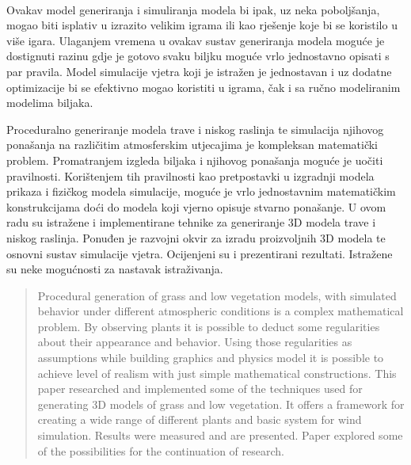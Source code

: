 \documentclass[times, utf8, diplomski]{fer}
\begin{document}
\paragraph{}
Ovakav model generiranja i simuliranja modela bi ipak, uz neka poboljšanja, mogao biti 
isplativ u izrazito velikim igrama ili kao rješenje koje bi se koristilo u više igara. 
Ulaganjem vremena u ovakav sustav generiranja modela moguće je dostignuti razinu gdje je 
gotovo svaku biljku moguće vrlo jednostavno opisati s par pravila. Model simulacije vjetra 
koji je istražen je jednostavan i uz dodatne optimizacije bi se efektivno mogao koristiti u 
igrama, čak i sa ručno modeliranim modelima biljaka.


\listoffigures

\lstlistoflistings
{}




\begin{sazetak}
Proceduralno generiranje modela trave i niskog raslinja te simulacija njihovog ponašanja na 
različitim atmosferskim utjecajima je kompleksan matematički problem. Promatranjem izgleda 
biljaka i njihovog ponašanja moguće je uočiti pravilnosti. Korištenjem tih pravilnosti kao 
pretpostavki u izgradnji modela prikaza i fizičkog modela simulacije, moguće je vrlo 
jednostavnim matematičkim konstrukcijama doći do modela koji vjerno opisuje stvarno 
ponašanje. U ovom radu su istražene i implementirane tehnike za generiranje 3D modela trave 
i niskog raslinja. Ponuđen je razvojni okvir za izradu proizvoljnih 3D modela te osnovni 
sustav simulacije vjetra. Ocijenjeni su i prezentirani rezultati. Istražene su neke 
mogućnosti za nastavak istraživanja.

\end{sazetak}

\begin{abstract}
Procedural generation of grass and low vegetation models, with simulated behavior under 
different atmospheric conditions is a complex mathematical problem. By observing plants it 
is possible to deduct some regularities about their appearance and behavior. Using those 
regularities as assumptions while building graphics and physics model it is possible to 
achieve level of realism with just simple mathematical constructions. This paper researched 
and implemented some of the techniques used for generating 3D models of grass and low 
vegetation. It offers a framework for creating a wide range of different plants and basic 
system for wind simulation. Results were measured and are presented. Paper explored some of the possibilities for the continuation of research.

\end{abstract}
\end{document}

